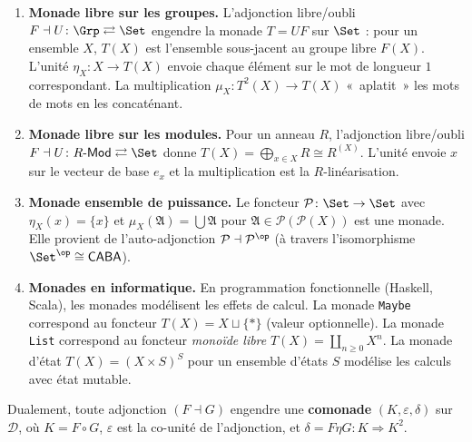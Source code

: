 \begin{exemple}\label{ex:monades-adjonctions}
\begin{enumerate}[label=(\roman*)]
\item \textbf{Monade libre sur les groupes.}%
    L'adjonction libre/oubli $F \dashv U \colon \Grp \rightleftarrows \Set$
    engendre la monade $T = UF$ sur $\Set$ : pour un ensemble $X$,
    $T(X)$ est l'ensemble sous-jacent au groupe libre $F(X)$.
    L'unité $\eta_X \colon X \to T(X)$ envoie chaque élément sur le
    mot de longueur $1$ correspondant. La multiplication
    $\mu_X \colon T^2(X) \to T(X)$ «~aplatit~» les mots de mots
    en les concaténant.

\item \textbf{Monade libre sur les modules.}%
    Pour un anneau $R$, l'adjonction libre/oubli
    $F \dashv U \colon R\text{-}\mathsf{Mod} \rightleftarrows \Set$
    donne $T(X) = \bigoplus_{x \in X} R \cong R^{(X)}$.
    L'unité envoie $x$ sur le vecteur de base $e_x$
    et la multiplication est la $R$-linéarisation.

\item \textbf{Monade ensemble de puissance.}%
    Le foncteur $\mathcal{P} \colon \Set \to \Set$
    avec $\eta_X(x) = \{x\}$ et $\mu_X(\mathfrak{A}) = \bigcup \mathfrak{A}$
    pour $\mathfrak{A} \in \mathcal{P}(\mathcal{P}(X))$
    est une monade. Elle provient de l'auto-adjonction
    $\mathcal{P} \dashv \mathcal{P}^{\op}$ (à travers l'isomorphisme
    $\Set^{\op} \cong \mathsf{CABA}$).

\item \textbf{Monades en informatique.}%
    En programmation fonctionnelle (Haskell, Scala), les monades modélisent
    les effets de calcul. La monade \texttt{Maybe} correspond au foncteur
    $T(X) = X \sqcup \{*\}$ (valeur optionnelle). La monade \texttt{List}
    correspond au foncteur \emph{monoïde libre} $T(X) = \coprod_{n \geq 0} X^n$.
    La monade d'état $T(X) = (X \times S)^S$ pour un ensemble d'états $S$
    modélise les calculs avec état mutable.
\end{enumerate}
\end{exemple}

\begin{proposition}\label{prop:comonade}
Dualement, toute adjonction $(F \dashv G)$ engendre une \textbf{comonade}
$(K, \varepsilon, \delta)$ sur $\mathcal{D}$, où
$K = F \circ G$, $\varepsilon$ est la co-unité de l'adjonction,
et $\delta = F\eta G \colon K \Rightarrow K^2$.
\end{proposition}

